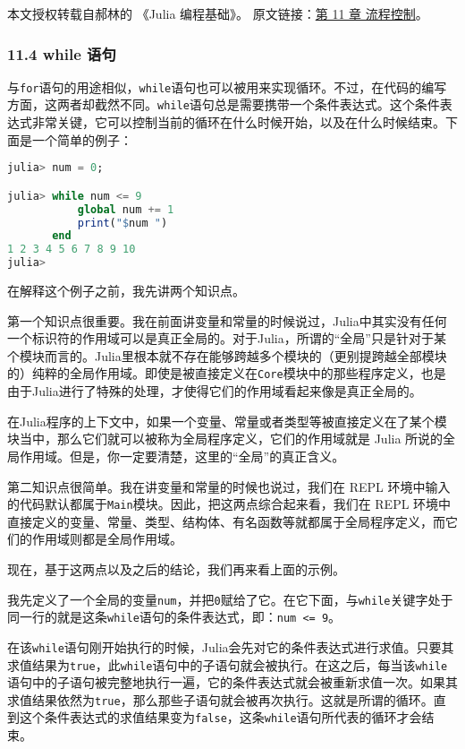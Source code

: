 
本文授权转载自郝林的 《Julia 编程基础》。 原文链接：\href{https://github.com/hyper0x/JuliaBasics/blob/master/book/ch11.md}{第 11 章 流程控制}。


\subsubsection{11.4 while 语句}

与\verb`for`语句的用途相似，\verb`while`语句也可以被用来实现循环。不过，在代码的编写方面，这两者却截然不同。\verb`while`语句总是需要携带一个条件表达式。这个条件表达式非常关键，它可以控制当前的循环在什么时候开始，以及在什么时候结束。下面是一个简单的例子：

\begin{lstlisting}[language=julia]
julia> num = 0;

julia> while num <= 9 
           global num += 1 
           print("$num ") 
       end
1 2 3 4 5 6 7 8 9 10 
julia> 
\end{lstlisting}

在解释这个例子之前，我先讲两个知识点。

第一个知识点很重要。我在前面讲变量和常量的时候说过，Julia中其实没有任何一个标识符的作用域可以是真正全局的。对于Julia，所谓的“全局”只是针对于某个模块而言的。Julia里根本就不存在能够跨越多个模块的（更别提跨越全部模块的）纯粹的全局作用域。即使是被直接定义在\verb`Core`模块中的那些程序定义，也是由于Julia进行了特殊的处理，才使得它们的作用域看起来像是真正全局的。

在Julia程序的上下文中，如果一个变量、常量或者类型等被直接定义在了某个模块当中，那么它们就可以被称为全局程序定义，它们的作用域就是 Julia 所说的全局作用域。但是，你一定要清楚，这里的“全局”的真正含义。

第二知识点很简单。我在讲变量和常量的时候也说过，我们在 REPL 环境中输入的代码默认都属于\verb`Main`模块。因此，把这两点综合起来看，我们在 REPL 环境中直接定义的变量、常量、类型、结构体、有名函数等就都属于全局程序定义，而它们的作用域则都是全局作用域。

现在，基于这两点以及之后的结论，我们再来看上面的示例。

我先定义了一个全局的变量\verb`num`，并把\verb`0`赋给了它。在它下面，与\verb`while`关键字处于同一行的就是这条\verb`while`语句的条件表达式，即：\verb`num <= 9`。

在该\verb`while`语句刚开始执行的时候，Julia会先对它的条件表达式进行求值。只要其求值结果为\verb`true`，此\verb`while`语句中的子语句就会被执行。在这之后，每当该\verb`while`语句中的子语句被完整地执行一遍，它的条件表达式就会被重新求值一次。如果其求值结果依然为\verb`true`，那么那些子语句就会被再次执行。这就是所谓的循环。直到这个条件表达式的求值结果变为\verb`false`，这条\verb`while`语句所代表的循环才会结束。

